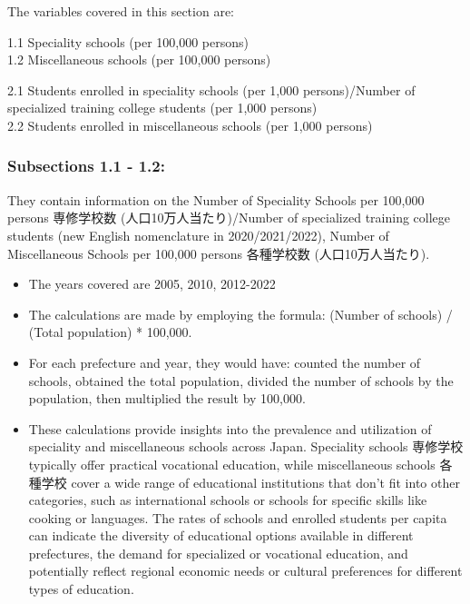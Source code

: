 \documentclass[
]{ltjarticle}
\begin{document}
The variables covered in this section are:

1.1 Speciality schools (per 100,000 persons)\\
1.2 Miscellaneous schools (per 100,000 persons)

2.1 Students enrolled in speciality schools (per 1,000 persons)/Number
of specialized training college students (per 1,000 persons)\\
2.2 Students enrolled in miscellaneous schools (per 1,000 persons)

\hypertarget{subsections-1.1---1.2-2}{%
\subsubsection{Subsections 1.1 - 1.2:}\label{subsections-1.1---1.2-2}}

They contain information on the Number of Speciality Schools per 100,000
persons 専修学校数 (人口10万人当たり)/Number of specialized training
college students (new English nomenclature in 2020/2021/2022), Number of
Miscellaneous Schools per 100,000 persons 各種学校数 (人口10万人当たり).

\begin{itemize}
\item
  The years covered are 2005, 2010, 2012-2022
\item
  The calculations are made by employing the formula: (Number of
  schools) / (Total population) * 100,000.
\item
  For each prefecture and year, they would have: counted the number of
  schools, obtained the total population, divided the number of schools
  by the population, then multiplied the result by 100,000.
\item
  These calculations provide insights into the prevalence and
  utilization of speciality and miscellaneous schools across Japan.
  Speciality schools 専修学校 typically offer practical vocational
  education, while miscellaneous schools 各種学校 cover a wide range of
  educational institutions that don't fit into other categories, such as
  international schools or schools for specific skills like cooking or
  languages. The rates of schools and enrolled students per capita can
  indicate the diversity of educational options available in different
  prefectures, the demand for specialized or vocational education, and
  potentially reflect regional economic needs or cultural preferences
  for different types of education.
\end{itemize}
\end{document}
